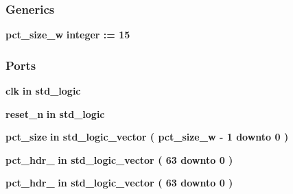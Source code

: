 \subsubsection*{Generics}
 \begin{DoxyCompactItemize}
\item 
{\bf pct\+\_\+size\+\_\+w} {\bfseries {\bfseries \textcolor{comment}{integer}\textcolor{vhdlchar}{ }\textcolor{vhdlchar}{ }\textcolor{vhdlchar}{\+:}\textcolor{vhdlchar}{=}\textcolor{vhdlchar}{ }\textcolor{vhdlchar}{ } \textcolor{vhdldigit}{15} \textcolor{vhdlchar}{ }}}
\end{DoxyCompactItemize}
\subsubsection*{Ports}
 \begin{DoxyCompactItemize}
\item 
{\bf clk}  {\bfseries {\bfseries \textcolor{keywordflow}{in}\textcolor{vhdlchar}{ }}} {\bfseries \textcolor{comment}{std\+\_\+logic}\textcolor{vhdlchar}{ }} 
\item 
{\bf reset\+\_\+n}  {\bfseries {\bfseries \textcolor{keywordflow}{in}\textcolor{vhdlchar}{ }}} {\bfseries \textcolor{comment}{std\+\_\+logic}\textcolor{vhdlchar}{ }} 
\item 
{\bf pct\+\_\+size}  {\bfseries {\bfseries \textcolor{keywordflow}{in}\textcolor{vhdlchar}{ }}} {\bfseries \textcolor{comment}{std\+\_\+logic\+\_\+vector}\textcolor{vhdlchar}{ }\textcolor{vhdlchar}{(}\textcolor{vhdlchar}{ }\textcolor{vhdlchar}{ }\textcolor{vhdlchar}{ }\textcolor{vhdlchar}{ }{\bfseries {\bf pct\+\_\+size\+\_\+w}} \textcolor{vhdlchar}{-\/}\textcolor{vhdlchar}{ } \textcolor{vhdldigit}{1} \textcolor{vhdlchar}{ }\textcolor{keywordflow}{downto}\textcolor{vhdlchar}{ }\textcolor{vhdlchar}{ } \textcolor{vhdldigit}{0} \textcolor{vhdlchar}{ }\textcolor{vhdlchar}{)}\textcolor{vhdlchar}{ }} 
\item 
{\bf pct\+\_\+hdr\+\_}  {\bfseries {\bfseries \textcolor{keywordflow}{in}\textcolor{vhdlchar}{ }}} {\bfseries \textcolor{comment}{std\+\_\+logic\+\_\+vector}\textcolor{vhdlchar}{ }\textcolor{vhdlchar}{(}\textcolor{vhdlchar}{ }\textcolor{vhdlchar}{ } \textcolor{vhdldigit}{63} \textcolor{vhdlchar}{ }\textcolor{keywordflow}{downto}\textcolor{vhdlchar}{ }\textcolor{vhdlchar}{ } \textcolor{vhdldigit}{0} \textcolor{vhdlchar}{ }\textcolor{vhdlchar}{)}\textcolor{vhdlchar}{ }} 
\item 
{\bf pct\+\_\+hdr\+\_}  {\bfseries {\bfseries \textcolor{keywordflow}{in}\textcolor{vhdlchar}{ }}} {\bfseries \textcolor{comment}{std\+\_\+logic\+\_\+vector}\textcolor{vhdlchar}{ }\textcolor{vhdlchar}{(}\textcolor{vhdlchar}{ }\textcolor{vhdlchar}{ } \textcolor{vhdldigit}{63} \textcolor{vhdlchar}{ }\textcolor{keywordflow}{downto}\textcolor{vhdlchar}{ }\textcolor{vhdlchar}{ } \textcolor{vhdldigit}{0} \textcolor{vhdlchar}{ }\textcolor{vhdlchar}{)}\textcolor{vhdlchar}{ }} 

\end{DoxyCompactItemize}
